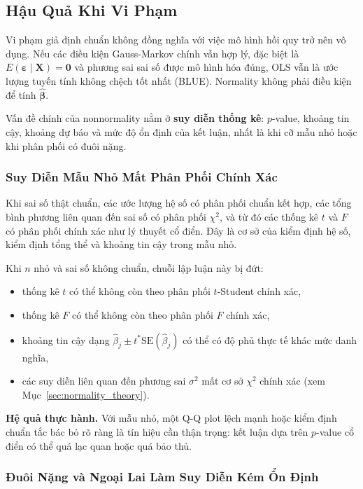 \subsection{Hậu Quả Khi Vi Phạm}

Vi phạm giả định chuẩn không đồng nghĩa với việc mô hình hồi quy trở nên vô dụng. Nếu các điều kiện Gauss-Markov chính vẫn hợp lý, đặc biệt là $E(\boldsymbol{\varepsilon}\mid\mathbf{X})=\mathbf{0}$ và phương sai sai số được mô hình hóa đúng, OLS vẫn là ước lượng tuyến tính không chệch tốt nhất (BLUE). Normality không phải điều kiện để tính $\hat{\boldsymbol{\beta}}$.

Vấn đề chính của nonnormality nằm ở \textbf{suy diễn thống kê}: $p$-value, khoảng tin cậy, khoảng dự báo và mức độ ổn định của kết luận, nhất là khi cỡ mẫu nhỏ hoặc khi phân phối có đuôi nặng.

\subsubsection{Suy Diễn Mẫu Nhỏ Mất Phân Phối Chính Xác}

Khi sai số thật chuẩn, các ước lượng hệ số có phân phối chuẩn kết hợp, các tổng bình phương liên quan đến sai số có phân phối $\chi^2$, và từ đó các thống kê $t$ và $F$ có phân phối chính xác như lý thuyết cổ điển. Đây là cơ sở của kiểm định hệ số, kiểm định tổng thể và khoảng tin cậy trong mẫu nhỏ.

Khi $n$ nhỏ và sai số không chuẩn, chuỗi lập luận này bị đứt:
\begin{itemize}
  \item thống kê $t$ có thể không còn theo phân phối $t$-Student chính xác,
  \item thống kê $F$ có thể không còn theo phân phối $F$ chính xác,
  \item khoảng tin cậy dạng $\hat{\beta}_j \pm t^*\mathrm{SE}(\hat{\beta}_j)$ có thể có độ phủ thực tế khác mức danh nghĩa,
  \item các suy diễn liên quan đến phương sai $\sigma^2$ mất cơ sở $\chi^2$ chính xác (xem Mục~\ref{sec:normality_theory}).
\end{itemize}

\textbf{Hệ quả thực hành.} Với mẫu nhỏ, một Q-Q plot lệch mạnh hoặc kiểm định chuẩn tắc bác bỏ rõ ràng là tín hiệu cần thận trọng: kết luận dựa trên $p$-value cổ điển có thể quá lạc quan hoặc quá bảo thủ.

\subsubsection{Đuôi Nặng và Ngoại Lai Làm Suy Diễn Kém Ổn Định}

